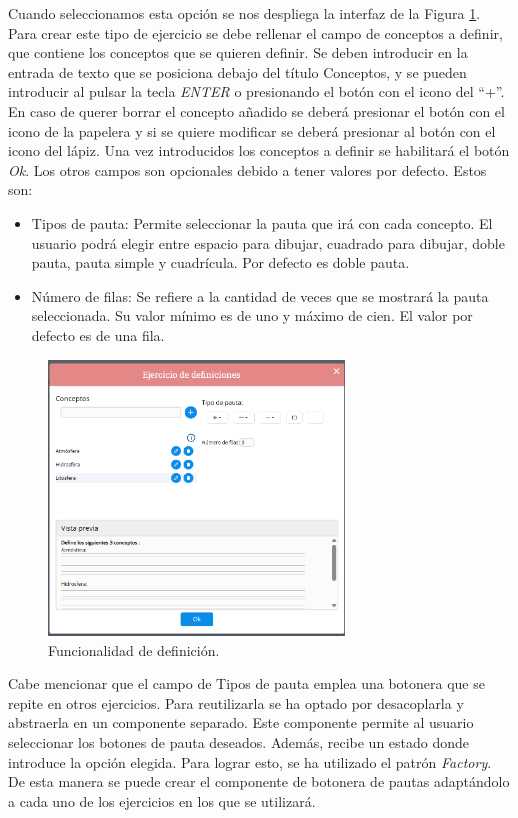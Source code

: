 Cuando seleccionamos esta opción se nos despliega la interfaz de la Figura \ref{fig:funcionalidadDefinicion}. Para crear este tipo de ejercicio se debe rellenar el campo de conceptos a definir, que contiene los conceptos que se quieren definir. Se deben introducir en la entrada de texto que se posiciona debajo del título Conceptos, y se pueden introducir al pulsar la tecla \textit{ENTER} o presionando el botón con el icono del ``+''. En caso de querer borrar el concepto añadido se deberá presionar el botón con el icono de la papelera y si se quiere modificar se deberá presionar al botón con el icono del lápiz.
Una vez introducidos los conceptos a definir se habilitará el botón \textit{Ok}. Los otros campos son opcionales debido a tener valores por defecto. Estos son:
\begin{itemize}
  \item Tipos de pauta: Permite seleccionar la pauta que irá con cada concepto. El usuario podrá elegir entre espacio para dibujar, cuadrado para dibujar, doble pauta, pauta simple y cuadrícula. Por defecto es doble pauta.
  \item Número de filas: Se refiere a la cantidad de veces que se mostrará la pauta seleccionada. Su valor mínimo es de uno y máximo de cien. El valor por defecto es de una fila.
\end{itemize}
\begin{figure}[ht!]
  \centering
  \includegraphics[width=0.7\textwidth]{Imagenes/Funcionalidades/EjercicioDefinicion.png}
  \caption{Funcionalidad de definición.}
  \label{fig:funcionalidadDefinicion}
\end{figure}
Cabe mencionar que el campo de Tipos de pauta emplea una botonera que se repite en otros ejercicios. Para reutilizarla se ha optado por desacoplarla y abstraerla en un componente separado. Este componente permite al usuario seleccionar los botones de pauta deseados. Además, recibe un estado donde introduce la opción elegida.
Para lograr esto, se ha utilizado el patrón \textit{Factory}. De esta manera se puede crear el componente de botonera de pautas adaptándolo a cada uno de los ejercicios en los que se utilizará.

